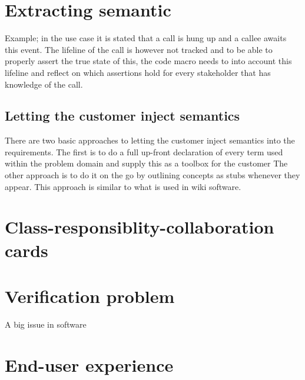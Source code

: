 \section{Extracting semantic}
Example; in the use case it is stated that a call is hung up and a callee awaits this event. The lifeline of the call is however not tracked and to be able to properly assert the true state of this, the code macro needs to into account this lifeline and reflect on which assertions hold for every stakeholder that has knowledge of the call. %

\subsection{Letting the customer inject semantics}

There are two basic approaches to letting the customer inject semantics into the requirements. The first is to do a full up-front declaration of every term used within the problem domain and supply this as a toolbox for the customer %
The other approach is to do it on the go by outlining concepts as stubs whenever they appear. This approach is similar to what is used in wiki software. %

\section{Class-responsiblity-collaboration cards}

\section{Verification problem}
A big issue in software

\section{End-user experience}


